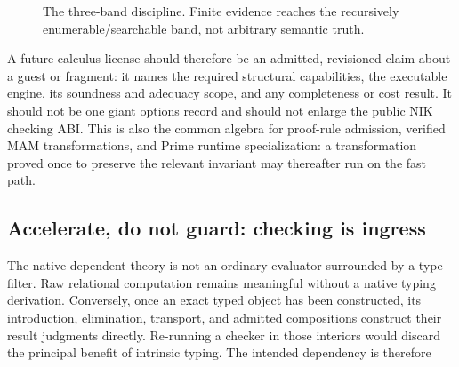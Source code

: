 \documentclass[11pt]{article}
\newcommand{\NIK}{NIK}
\begin{document}
\begin{figure}[ht]
\centering
{}
\caption{The three-band discipline.  Finite evidence reaches the recursively
enumerable/searchable band, not arbitrary semantic truth.}
\label{fig:nik-three-bands}
\end{figure}

A future calculus license should therefore be an admitted, revisioned claim about
a guest or fragment: it names the required structural capabilities, the executable
engine, its soundness and adequacy scope, and any completeness or cost result.  It
should not be one giant options record and should not enlarge the public \NIK{}
checking ABI.  This is also the common algebra for proof-rule admission, verified
MAM transformations, and Prime runtime specialization: a transformation proved
once to preserve the relevant invariant may thereafter run on the fast path.

\subsection{Accelerate, do not guard: checking is ingress}

The native dependent theory is not an ordinary evaluator surrounded by a type
filter.  Raw relational computation remains meaningful without a native typing
derivation.  Conversely, once an exact typed object has been constructed, its
introduction, elimination, transport, and admitted compositions construct their
result judgments directly.  Re-running a checker in those interiors would discard
the principal benefit of intrinsic typing.  The intended dependency is therefore
\end{document}
